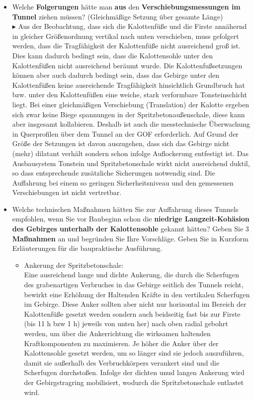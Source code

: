 \documentclass[fleqn,twoside]{article}
\begin{document}
\begin{small}
\begin{itemize}
    \item Welche \textbf{Folgerungen} hätte man \textbf{aus} den \textbf{Verschiebungsmessungen im Tunnel} ziehen müssen? (Gleichmäßige Setzung über gesamte Länge)\\
    $\blacktriangleright$ Aus der Beobachtung, dass sich die Kalottenfüße und die Firste annähernd in gleicher Größenordnung vertikal nach unten verschieben, muss gefolgert werden, dass die Tragfähigkeit der Kalottenfüße nicht ausreichend groß ist. Dies kann dadurch bedingt sein, dass die Kalottensohle unter den Kalottenfüßen nicht ausreichend beräumt wurde. Die Kalottenfußsetzungen können aber auch dadurch bedingt sein, dass das Gebirge unter den Kalottenfüßen keine ausreichende Tragfähigkeit hinsichtlich Grundbruch hat bzw. unter den Kalottenfüßen eine weiche, stark verformbare Tonsteinschicht liegt. Bei einer gleichmäßigen Verschiebung (Translation) der Kalotte ergeben sich zwar keine Biege spannungen in der Spritzbetonaußenschale, diese kann aber insgesamt kollabieren. Deshalb ist auch die messtechnische Überwachung in Querprofilen über dem Tunnel an der GOF erforderlich. Auf Grund der Größe der Setzungen ist davon auszugehen, dass sich das Gebirge nicht (mehr) dilatant verhält sondern schon infolge Auflockerung entfestigt ist. Das Ausbausystem Tonstein und Spritzbetonschale wirkt nicht ausreichend duktil, so dass entsprechende zusätzliche Sicherungen notwendig sind. Die Auffahrung bei einem so geringen Sicherheitsniveau und den gemessenen Verschiebungen ist nicht vertretbar.
    \item Welche technischen Maßnahmen hätten Sie zur Auffahrung dieses Tunnels empfohlen, wenn Sie vor Baubeginn schon die \textbf{niedrige Langzeit-Kohäsion des Gebirges unterhalb der Kalottensohle} gekannt hätten? Geben Sie 3 \textbf{Maßnahmen} an und begründen Sie Ihre Vorschläge. Geben Sie in Kurzform Erläuterungen für die baupraktische Ausführung.
    \begin{itemize}[label={$\blacktriangleright$}]
        \item Ankerung der Spritzbetonschale:\\
        Eine ausreichend lange und dichte Ankerung, die durch die Scherfugen des grabenartigen Verbruches in das Gebirge seitlich des Tunnels reicht, bewirkt eine Erhöhung der Haltenden Kräfte in den vertikalen Scherfugen im Gebirge. Diese Anker sollten aber nicht nur horizontal im Bereich der Kalottenfüße gesetzt werden sondern auch beidseitig fast bis zur Firste (bis 11 h bzw 1 h) jeweils von unten her) nach oben radial gebohrt werden, um über die Ankerrichtung die wirksamen haltenden Kraftkomponenten zu maximieren. Je höher die Anker über der Kalottensohle gesetzt werden, um so länger sind sie jedoch auszuführen, damit sie außerhalb des Verbruchkörpers verankert sind und die Scherfugen durchstoßen. Infolge der dichten unud langen Ankerung wird der Gebirgstragring mobilisiert, wodurch die Spritzbetonschale entlastet wird.

\end{itemize}
\end{itemize}
\end{small}
\end{document}

